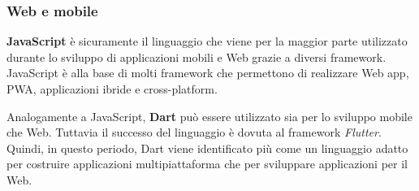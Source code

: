 \subsubsection{Web e mobile}
\textbf{JavaScript} è sicuramente il linguaggio che viene per la maggior parte utilizzato durante lo sviluppo di applicazioni mobili e Web grazie a diversi framework. JavaScript è alla base di molti framework che permettono di realizzare Web app, PWA, applicazioni ibride e cross-platform.

Analogamente a JavaScript, \textbf{Dart} può essere utilizzato sia per lo sviluppo mobile che Web. Tuttavia il successo del linguaggio è dovuta al framework \textit{Flutter}. Quindi, in questo periodo, Dart viene identificato più come un linguaggio adatto per costruire applicazioni multipiattaforma che per sviluppare applicazioni per il Web.